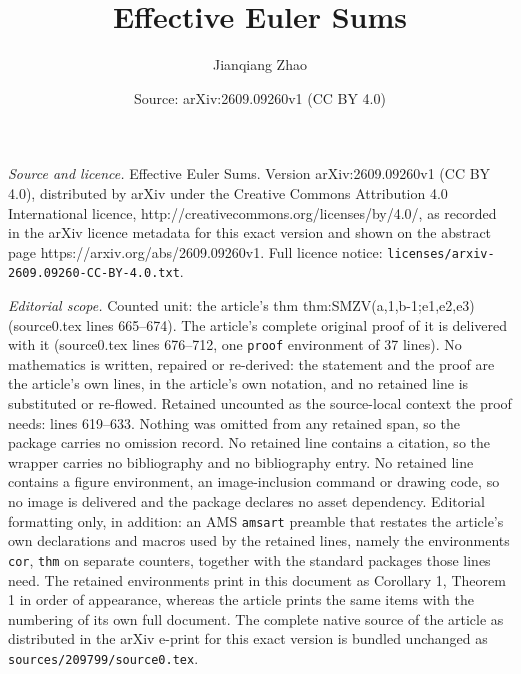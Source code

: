 \documentclass[10pt,a4paper]{amsart}
\title{Effective Euler Sums}
\author{Jianqiang Zhao}
\date{Source: arXiv:2609.09260v1 (CC BY 4.0)}
\begin{document}
\maketitle

\noindent\emph{Source and licence.} Effective Euler Sums. Version arXiv:2609.09260v1 (CC BY 4.0), distributed by arXiv under the Creative Commons Attribution 4.0 International licence, http://creativecommons.org/licenses/by/4.0/, as recorded in the arXiv licence metadata for this exact version and shown on the abstract page https://arxiv.org/abs/2609.09260v1. Full licence notice: \texttt{licenses/arxiv-2609.09260-CC-BY-4.0.txt}.\par\smallskip

\noindent\textit{Editorial scope.} Counted unit: the article's thm thm:SMZV(a,1,b-1;e1,e2,e3) (source0.tex lines 665--674). The article's complete original proof of it is delivered with it (source0.tex lines 676--712, one \texttt{proof} environment of 37 lines). No mathematics is written, repaired or re-derived: the statement and the proof are the article's own lines, in the article's own notation, and no retained line is substituted or re-flowed.  Retained uncounted as the source-local context the proof needs: lines 619--633.  Nothing was omitted from any retained span, so the package carries no omission record.  No retained line contains a citation, so the wrapper carries no bibliography and no bibliography entry.  No retained line contains a figure environment, an image-inclusion command or drawing code, so no image is delivered and the package declares no asset dependency.  Editorial formatting only, in addition: an AMS \texttt{amsart} preamble that restates the article's own declarations and macros used by the retained lines, namely the environments \texttt{cor}, \texttt{thm} on separate counters, together with the standard packages those lines need.  The retained environments print in this document as Corollary 1, Theorem 1 in order of appearance, whereas the article prints the same items with the numbering of its own full document.  The complete native source of the article as distributed in the arXiv e-print for this exact version is bundled unchanged as \texttt{sources/209799/source0.tex}.
\end{document}
